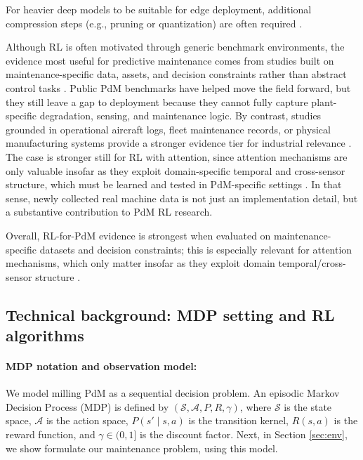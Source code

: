 \documentclass[sn-basic]{sn-jnl} %
\begin{document}
For heavier deep models to be suitable for edge deployment, additional compression steps (e.g., pruning or quantization) are often required \cite{Pandey2023, Jang2020, Xu2022}.

Although RL is often motivated through generic benchmark environments, the evidence most useful for predictive maintenance comes from studies built on maintenance-specific data, assets, and decision constraints rather than abstract control tasks \cite{Andrade2021Aircraft,Dangut2022RareFailure,Zhao2024,Siraskar2025}. Public PdM benchmarks have helped move the field forward, but they still leave a gap to deployment because they cannot fully capture plant-specific degradation, sensing, and maintenance logic. By contrast, studies grounded in operational aircraft logs, fleet maintenance records, or physical manufacturing systems provide a stronger evidence tier for industrial relevance \cite{Andrade2021Aircraft,Dangut2022RareFailure,Chen2024DigitalTwin}. The case is stronger still for RL with attention, since attention mechanisms are only valuable insofar as they exploit domain-specific temporal and cross-sensor structure, which must be learned and tested in PdM-specific settings \cite{Zhao2024}. In that sense, newly collected real machine data is not just an implementation detail, but a substantive contribution to PdM RL research.

Overall, RL-for-PdM evidence is strongest when evaluated on maintenance-specific datasets and decision constraints; this is especially relevant for attention mechanisms, which only matter insofar as they exploit domain temporal/cross-sensor structure \cite{Zhao2024}.

\subsection{Technical background: MDP setting and RL algorithms}
\label{sec:tech_background}
\paragraph{MDP notation and observation model:}
We model milling PdM as a sequential decision problem. An episodic Markov Decision Process (MDP) is defined by $(\mathcal{S},\mathcal{A},P,R,\gamma)$, where $\mathcal{S}$ is the state space, $\mathcal{A}$ is the action space, $P(s'\mid s,a)$ is the transition kernel, $R(s,a)$ is the reward function, and $\gamma\in(0,1]$ is the discount factor. Next, in Section \ref{sec:env}, we show formulate our maintenance problem, using this model. 
\end{document}
